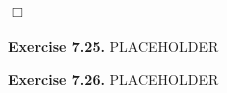 \documentclass{article}
\begin{document}
$\Box$ \\\\






\textbf{Exercise 7.25.}
PLACEHOLDER






\textbf{Exercise 7.26.}
PLACEHOLDER



\end{document}
